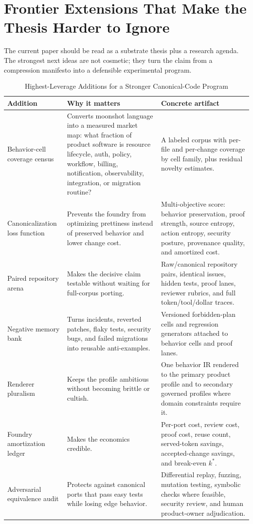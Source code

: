 \section{Frontier Extensions That Make the Thesis Harder to Ignore}
\label{sec:level-up}

The current paper should be read as a substrate thesis plus a research agenda. The strongest next ideas are not cosmetic; they turn the claim from a compression manifesto into a defensible experimental program.

\begin{table}[t]
\caption{Highest-Leverage Additions for a Stronger Canonical-Code Program}
\label{tab:levelup}
\centering
\footnotesize
\begin{tabularx}{\textwidth}{p{}X X}
\toprule
\textbf{Addition} & \textbf{Why it matters} & \textbf{Concrete artifact} \\
\midrule
Behavior-cell coverage census & Converts moonshot language into a measured market map: what fraction of product software is resource lifecycle, auth, policy, workflow, billing, notification, observability, integration, or migration routine? & A labeled corpus with per-file and per-change coverage by cell family, plus residual novelty estimates. \\
Canonicalization loss function & Prevents the foundry from optimizing prettiness instead of preserved behavior and lower change cost. & Multi-objective score: behavior preservation, proof strength, source entropy, action entropy, security posture, provenance quality, and amortized cost. \\
Paired repository arena & Makes the decisive claim testable without waiting for full-corpus porting. & Raw/canonical repository pairs, identical issues, hidden tests, proof lanes, reviewer rubrics, and full token/tool/dollar traces. \\
Negative memory bank & Turns incidents, reverted patches, flaky tests, security bugs, and failed migrations into reusable anti-examples. & Versioned forbidden-plan cells and regression generators attached to behavior cells and proof lanes. \\
Renderer pluralism & Keeps the profile ambitious without becoming brittle or cultish. & One behavior IR rendered to the primary product profile and to secondary governed profiles where domain constraints require it. \\
Foundry amortization ledger & Makes the economics credible. & Per-port cost, review cost, proof cost, reuse count, served-token savings, accepted-change savings, and break-even $k^*$. \\
Adversarial equivalence audit & Protects against canonical ports that pass easy tests while losing edge behavior. & Differential replay, fuzzing, mutation testing, symbolic checks where feasible, security review, and human product-owner adjudication. \\
\bottomrule
\end{tabularx}
\end{table}

